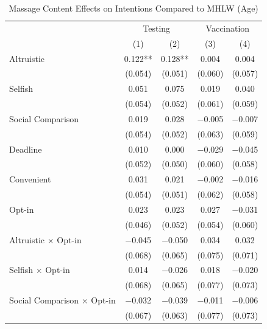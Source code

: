 \documentclass[
]{article}
\begin{document}
\begin{table}

\caption{\label{tab:reg-int-woA}Massage Content Effects on Intentions Compared to MHLW (Age)}
\centering
\fontsize{9}{11}\selectfont
\begin{threeparttable}
\begin{tabular}[t]{lcccc}
\toprule
\multicolumn{1}{c}{ } & \multicolumn{2}{c}{Testing} & \multicolumn{2}{c}{Vaccination} \\
\cmidrule(l{3pt}r{3pt}){2-3} \cmidrule(l{3pt}r{3pt}){4-5}
  & (1) & (2) & (3) & (4)\\
\midrule
Altruistic & \num{0.122}** & \num{0.128}** & \num{0.004} & \num{0.004}\\
 & (\num{0.054}) & (\num{0.051}) & (\num{0.060}) & (\num{0.057})\\
Selfish & \num{0.051} & \num{0.075} & \num{0.019} & \num{0.040}\\
 & (\num{0.054}) & (\num{0.052}) & (\num{0.061}) & (\num{0.059})\\
Social Comparison & \num{0.019} & \num{0.028} & \num{-0.005} & \num{-0.007}\\
 & (\num{0.054}) & (\num{0.052}) & (\num{0.063}) & (\num{0.059})\\
Deadline & \num{0.010} & \num{0.000} & \num{-0.029} & \num{-0.045}\\
 & (\num{0.052}) & (\num{0.050}) & (\num{0.060}) & (\num{0.058})\\
Convenient & \num{0.031} & \num{0.021} & \num{-0.002} & \num{-0.016}\\
 & (\num{0.054}) & (\num{0.051}) & (\num{0.062}) & (\num{0.058})\\
Opt-in & \num{0.023} & \num{0.023} & \num{0.027} & \num{-0.031}\\
 & (\num{0.046}) & (\num{0.052}) & (\num{0.054}) & (\num{0.060})\\
Altruistic $\times$ Opt-in & \num{-0.045} & \num{-0.050} & \num{0.034} & \num{0.032}\\
 & (\num{0.068}) & (\num{0.065}) & (\num{0.075}) & (\num{0.071})\\
Selfish $\times$ Opt-in & \num{0.014} & \num{-0.026} & \num{0.018} & \num{-0.020}\\
 & (\num{0.068}) & (\num{0.065}) & (\num{0.077}) & \vphantom{1} (\num{0.073})\\
Social Comparison $\times$ Opt-in & \num{-0.032} & \num{-0.039} & \num{-0.011} & \num{-0.006}\\
 & (\num{0.067}) & (\num{0.063}) & (\num{0.077}) & (\num{0.073})\\

\end{tabular}
\end{threeparttable}
\end{table}
\end{document}
